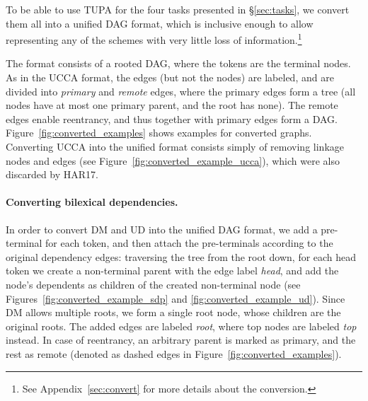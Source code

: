 \documentclass[11pt,a4paper]{article}
\begin{document}
To be able to use TUPA for the four tasks presented in \S\ref{sec:tasks},
we convert them all into a unified DAG format, which is inclusive enough to
allow representing any of the schemes with very little loss of information.\footnote{See
Appendix~\ref{sec:convert} for more details about the conversion.}

The format consists of a rooted DAG, where the tokens are the terminal nodes.
As in the UCCA format, the edges (but not the nodes) are labeled,
and are divided into \textit{primary} and \textit{remote} edges,
where the primary edges form a tree (all nodes have at most one primary parent,
and the root has none).
The remote edges enable reentrancy, and thus together with primary edges
form a DAG.
Figure~\ref{fig:converted_examples} shows examples for converted graphs.
Converting UCCA into the unified format consists simply of removing linkage 
nodes and edges (see Figure~\ref{fig:converted_example_ucca}), which were
also discarded by HAR17.

\paragraph{Converting bilexical dependencies.}
In order to convert DM and UD into the unified DAG format,
we add a pre-terminal for each token,
and then attach the pre-terminals according to the original dependency edges:
traversing the tree from the root down, for each head token we create a non-terminal
parent with the edge label {\it head},
and add the node's dependents as children of the created non-terminal node
(see Figures~\ref{fig:converted_example_sdp} and \ref{fig:converted_example_ud}).
Since DM allows multiple roots, we form a single root node, whose children
are the original roots. The added edges are labeled \textit{root}, where
top nodes are labeled \textit{top} instead.
In case of reentrancy, an arbitrary parent is marked as primary, and the rest as remote
(denoted as dashed edges in Figure~\ref{fig:converted_examples}).
\end{document}
